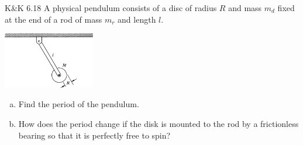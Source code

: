 \documentclass{esg8012pset}
\begin{document}
\begin{problem}{K\&K 6.18}
  A physical pendulum consists of a disc of radius $R$ and mass $m_d$ fixed at the end of a rod of mass $m_r$ and length $l$.
  \begin{center}\includegraphics[width=0.3\textwidth]{ps09_2}\end{center}
  \begin{enumerate}[(a)]
    \item Find the period of the pendulum.
    \item How does the period change if the disk is mounted to the rod by a frictionless bearing so that it is perfectly free to spin?
  \end{enumerate}
\end{problem}
\end{document}
